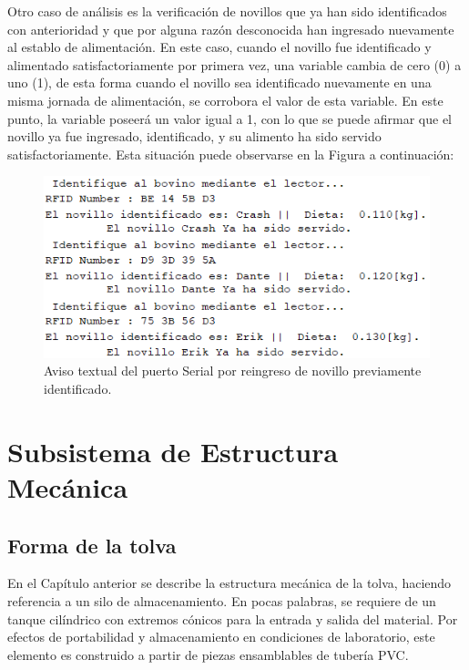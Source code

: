 Otro caso de análisis es la verificación de novillos que ya han sido identificados con anterioridad y que por alguna razón desconocida han ingresado nuevamente al establo de alimentación. En este caso, cuando el novillo fue identificado y alimentado satisfactoriamente por primera vez, una variable cambia de cero (0) a uno (1), de esta forma cuando el novillo sea identificado nuevamente en una misma jornada de alimentación, se corrobora el valor de esta variable. En este punto, la variable poseerá un valor igual a 1, con lo que se puede afirmar que el novillo ya fue ingresado, identificado, y su alimento ha sido servido satisfactoriamente. Esta situación puede observarse en la Figura a continuación:

\begin{figure}[H]
	\begin{center}
		\includegraphics[scale=0.7]{img/reprfid.png}
	\end{center}
	\caption{Aviso textual del puerto Serial por reingreso de novillo previamente identificado.}
\end{figure}




\section{Subsistema de Estructura Mecánica}
\subsection{Forma de la tolva}

En el Capítulo anterior se describe la estructura mecánica de la tolva, haciendo referencia a un silo de almacenamiento. En pocas palabras, se requiere de un tanque cilíndrico con extremos cónicos para la entrada y salida del material. Por efectos de portabilidad y almacenamiento en condiciones de laboratorio, este elemento es construido a partir de piezas ensamblables de tubería PVC. 

